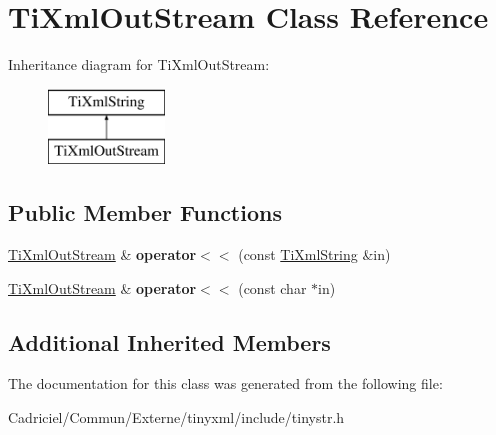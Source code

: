 \hypertarget{class_ti_xml_out_stream}{\section{Ti\-Xml\-Out\-Stream Class Reference}
\label{class_ti_xml_out_stream}
}
Inheritance diagram for Ti\-Xml\-Out\-Stream\-:\begin{figure}[H]
\begin{center}
\leavevmode
\includegraphics[height=2.000000cm]{class_ti_xml_out_stream}
\end{center}
\end{figure}
\subsection*{Public Member Functions}
\begin{DoxyCompactItemize}
\item 
\hypertarget{class_ti_xml_out_stream_a3640dcb1c0903be3bc6966cdc9a79db6}{\hyperlink{class_ti_xml_out_stream}{Ti\-Xml\-Out\-Stream} \& {\bfseries operator$<$$<$} (const \hyperlink{class_ti_xml_string}{Ti\-Xml\-String} \&in)}\label{class_ti_xml_out_stream_a3640dcb1c0903be3bc6966cdc9a79db6}

\item 
\hypertarget{class_ti_xml_out_stream_af2117e5a8cbfcb69544804ad2859bfb6}{\hyperlink{class_ti_xml_out_stream}{Ti\-Xml\-Out\-Stream} \& {\bfseries operator$<$$<$} (const char $\ast$in)}\label{class_ti_xml_out_stream_af2117e5a8cbfcb69544804ad2859bfb6}

\end{DoxyCompactItemize}
\subsection*{Additional Inherited Members}


The documentation for this class was generated from the following file\-:\begin{DoxyCompactItemize}
\item 
Cadriciel/\-Commun/\-Externe/tinyxml/include/tinystr.\-h\end{DoxyCompactItemize}
